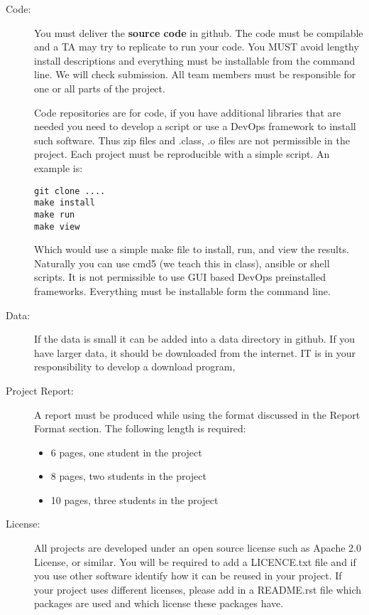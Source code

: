 \begin{description}
\item[Code:]
You must deliver the \textbf{source code} in github. The code must be
compilable and a TA may try to replicate to run your code. You MUST
avoid lengthy install descriptions and everything must be installable
from the command line. We will check submission. All team members must
be responsible for one or all parts of the project.

Code repositories are for code, if you have additional libraries that
are needed you need to develop a script or use a DevOps framework to
install such software. Thus zip files and .class, .o files are not
permissible in the project. Each project must be reproducible with a
simple script. An example is:

\begin{verbatim}
git clone ....
make install
make run
make view
\end{verbatim}

Which would use a simple make file to install, run, and view the
results. Naturally you can use cmd5 (we teach this in class), ansible or
shell scripts. It is not permissible to use GUI based DevOps
preinstalled frameworks. Everything must be installable form the command
line.
\item[Data:]
If the data is small it can be added into a data directory in github. If
you have larger data, it should be downloaded from the internet. IT is
in your responsibility to develop a download program,
\item[Project Report:]
A report must be produced while using the format discussed in the Report
Format section. The following length is required:

\begin{itemize}
\tightlist
\item
  6 pages, one student in the project
\item
  8 pages, two students in the project
\item
  10 pages, three students in the project
\end{itemize}
\item[License:]
All projects are developed under an open source license such as Apache
2.0 License, or similar. You will be required to add a LICENCE.txt file
and if you use other software identify how it can be reused in your
project. If your project uses different licenses, please add in a
README.rst file which packages are used and which license these packages
have.
\end{description}

